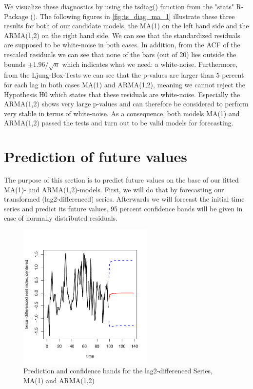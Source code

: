 \documentclass[11pt,a4paper]{article}
\begin{document}
We visualize these diagnostics by using the tsdiag() function from the "stats" R-Package (\citet{R_stats}).
The following figures in \cref{fig:ts_diag_ma_1} illustrate these three results for both of our candidate models, the MA(1) on the left hand side and the ARMA(1,2) on the right hand side.
We can see that the standardized residuals are supposed to be white-noise in both cases.
In addition, from the ACF of the rescaled residuals we can see that none of the bars (out of 20) lies outside the bounds $\pm 1.96 / \sqrt{n}$ which indicates what we need: a white-noise.
Furthermore, from the Ljung-Box-Tests we can see that the p-values are larger than 5 percent for each lag in both cases MA(1) and ARMA(1,2), meaning we cannot reject the Hypothesis H0 which states that these residuals are white-noise.
Especially the ARMA(1,2) shows very large p-values and can therefore be considered to perform very stable in terms of white-noise.
As a consequence, both models MA(1) and ARMA(1,2) passed the tests and turn out to be valid models for forecasting.



\section{Prediction of future values}

The purpose of this section is to predict future values on the base of our fitted MA(1)- and ARMA(1,2)-models.
First, we will do that by forecasting our transformed (lag2-differenced) series.
Afterwards we will forecast the initial time series and predict its future values.
95 percent confidence bands will be given in case of normally distributed residuals.

\begin{figure}
    \centering
    \includegraphics[width=0.6\textwidth]{pred_transformed_series}
    \caption{Prediction and confidence bands for the lag2-differenced Series, MA(1) and ARMA(1,2)}
    \label{fig:pred_transformed_series}
\end{figure}
\end{document}
